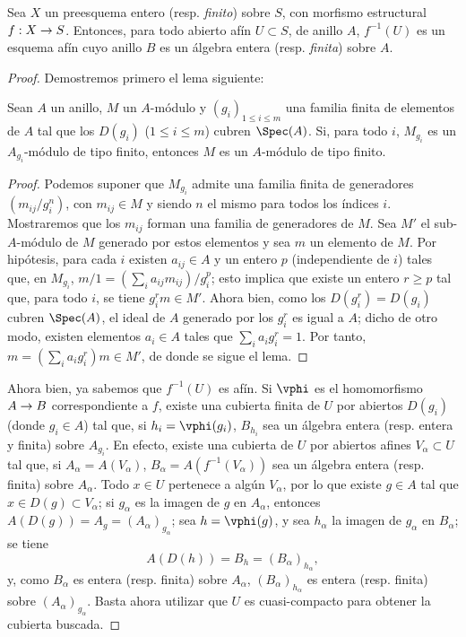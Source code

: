 \documentclass[oneside,10pt]{amsart}
\makeatletter
\renewcommand{\leq}{\leqslant}
\renewcommand{\geq}{\geqslant}
\newcommand{\ega@arrow}[2]{\mathchoice{#1}{#2}{#2}{#2}}
\renewcommand{\to}{\ega@arrow{\longrightarrow}{\rightarrow}}
\newcommand{\oldpage}[2][]{\marginnote{\normalfont\footnotesize\textbf{#1}~|~#2}\ignorespaces}
\let\EGAOriginalLabel\label
\renewcommand{\label}[1]{\phantomsection\EGAOriginalLabel{#1}}
\makeatother
\begin{document}
\begin{proposition}[6.1.4]
\label{II.6.1.4}
Sea $X$ un preesquema entero \textup{(resp. \emph{finito})} sobre $S$, con morfismo estructural $f:X\to S$.
Entonces, para todo abierto afín $U\subset S$, de anillo $A$, $f^{-1}(U)$ es un esquema afín cuyo anillo $B$ es un álgebra entera \textup{(resp. \emph{finita})} sobre $A$.
\end{proposition}

\oldpage[II]{111}
\begin{proof}
Demostremos primero el lema siguiente:

  \begin{lemma}[6.1.4.1]
  \label{II.6.1.4.1}
  Sean $A$ un anillo, $M$ un $A$-módulo y $(g_i)_{1\leq i\leq m}$ una familia finita de elementos de $A$ tal que los $D(g_i)$ ($1\leq i\leq m$) cubren $\Spec(A)$.
  Si, para todo $i$, $M_{g_i}$ es un $A_{g_i}$-módulo de tipo finito, entonces $M$ es un $A$-módulo de tipo finito.
  \end{lemma}

  \begin{proof}
  Podemos suponer que $M_{g_i}$ admite una familia finita de generadores $(m_{ij}/g_i^n)$, con $m_{ij}\in M$ y siendo $n$ el mismo para todos los índices $i$.
  Mostraremos que los $m_{ij}$ forman una familia de generadores de $M$.
  Sea $M'$ el sub-$A$-módulo de $M$ generado por estos elementos y sea $m$ un elemento de $M$.
  Por hipótesis, para cada $i$ existen $a_{ij}\in A$ y un entero $p$ (independiente de $i$) tales que, en $M_{g_i}$, $m/1=(\sum_i a_{ij}m_{ij})/g_i^p$;
  esto implica que existe un entero $r\geq p$ tal que, para todo $i$, se tiene $g_i^rm\in M'$.
  Ahora bien, como los $D(g_i^r)=D(g_i)$ cubren $\Spec(A)$, el ideal de $A$ generado por los $g_i^r$ es igual a $A$; dicho de otro modo, existen elementos $a_i\in A$ tales que $\sum_i a_ig_i^r=1$.
  Por tanto, $m=(\sum_i a_i g_i^r)m\in M'$, de donde se sigue el lema.
  \end{proof}

Ahora bien, ya sabemos  que $f^{-1}(U)$ es afín.
Si $\vphi$ es el homomorfismo $A\to B$ correspondiente a $f$, existe una cubierta finita de $U$ por abiertos $D(g_i)$ (donde $g_i\in A$) tal que, si $h_i=\vphi(g_i)$, $B_{h_i}$ sea un álgebra entera (resp. entera y finita) sobre $A_{g_i}$.
En efecto, existe una cubierta de $U$ por abiertos afines $V_\alpha\subset U$ tal que, si $A_\alpha=A(V_\alpha)$, $B_\alpha=A(f^{-1}(V_\alpha))$ sea un álgebra entera (resp. finita) sobre $A_\alpha$.
Todo $x\in U$ pertenece a algún $V_\alpha$, por lo que existe $g\in A$ tal que $x\in D(g)\subset V_\alpha$;
si $g_\alpha$ es la imagen de $g$ en $A_\alpha$, entonces $A(D(g))=A_g=(A_\alpha)_{g_\alpha}$;
sea $h=\vphi(g)$, y sea $h_\alpha$ la imagen de $g_\alpha$ en $B_\alpha$;
se tiene
\[
  A(D(h)) = B_h = (B_\alpha)_{h_\alpha},
\]
y, como $B_\alpha$ es entera (resp. finita) sobre $A_\alpha$, $(B_\alpha)_{h_\alpha}$ es entera (resp. finita) sobre $(A_\alpha)_{g_\alpha}$.
Basta ahora utilizar que $U$ es cuasi-compacto para obtener la cubierta buscada.


\end{proof}
\end{document}
